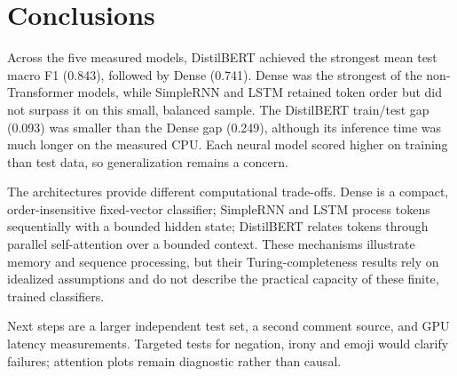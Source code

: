 \section{Conclusions}
\label{sec:conclusions}

Across the five measured models, DistilBERT achieved the strongest mean test
macro F1 (0.843), followed by Dense (0.741). Dense was the strongest of the
non-Transformer models, while SimpleRNN and LSTM retained token order but did
not surpass it on this small, balanced sample. The DistilBERT train/test gap
(0.093) was smaller than the Dense gap (0.249), although its inference time
was much longer on the measured CPU. Each neural model scored higher on
training than test data, so generalization remains a concern.

The architectures provide different computational trade-offs. Dense is a
compact, order-insensitive fixed-vector classifier; SimpleRNN and LSTM process
tokens sequentially with a bounded hidden state; DistilBERT relates tokens
through parallel self-attention over a bounded context. These mechanisms
illustrate memory and sequence processing, but their Turing-completeness
results rely on idealized assumptions and do not describe the practical
capacity of these finite, trained classifiers.

Next steps are a larger independent test set, a second comment source, and
GPU latency measurements. Targeted tests for negation, irony and emoji would
clarify failures; attention plots remain diagnostic rather than causal.
